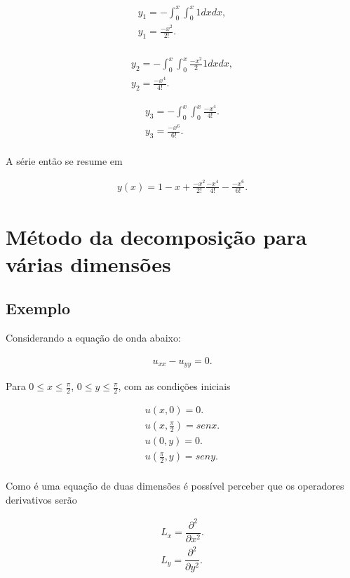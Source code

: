 \begin{gather*}
y_{1} = -\int_0^x \int_0^x  1dxdx,\\
y_{1} = \frac{-x^2}{2!}.\\
\end{gather*}

\begin{gather*}
y_{2} = -\int_0^x \int_0^x\frac{-x^2}{2}1dxdx,\\
y_{2} = \frac{-x^4}{4!}.
\end{gather*}

\begin{gather*}
y_{3} = -\int_0^x\int_0^x \frac{-x^4}{4!}.\\
y_{3} = \frac{-x^6}{6!}.\\
\end{gather*}



A série então se resume em

\begin{gather*}
y(x) = 1 - x + \frac{-x^2}{2!} \frac{-x^4}{4!}- \frac{-x^6}{6!}.
\end{gather*}

\section{Método da decomposição para várias dimensões}

\subsection{Exemplo }
Considerando a equação de onda abaixo:

\begin{gather*}
 u_{xx} - u_{yy} = 0.
\end{gather*}

Para $0\leq x \leq \frac{\pi}{2}$, $0\leq y \leq \frac{\pi}{2}$, com as condições iniciais 

\begin{gather*}
u(x,0) = 0.\\
u\left(x,\frac{\pi}{2}\right) = senx.\\
u(0,y) = 0.\\
u\left(\frac{\pi}{2},y\right) = seny.\\
\end{gather*}

Como é uma equação de duas dimensões é possível perceber que os operadores derivativos serão

\begin{gather*}
L_{x} =\dfrac{\partial ^2}{\partial x^2}.\\
L_{y} = \dfrac{\partial ^2}{\partial y^2} .\\      
\end{gather*}

